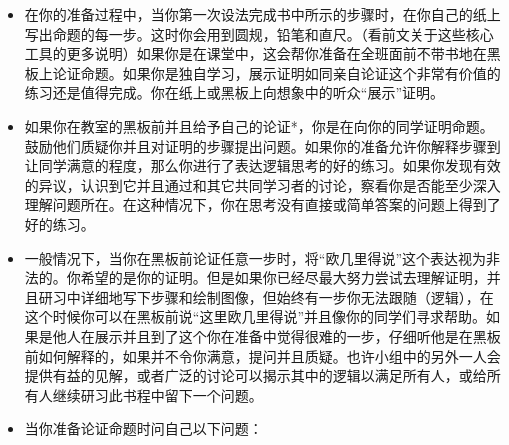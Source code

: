 \documentclass[
]{book}
\begin{document}
\begin{itemize}
\item
  在你的准备过程中，当你第一次设法完成书中所示的步骤时，在你自己的纸上写出命题的每一步。这时你会用到圆规，铅笔和直尺。（看前文关于这些核心工具的更多说明）如果你是在课堂中，这会帮你准备在全班面前不带书地在黑板上论证命题。如果你是独自学习，展示证明如同亲自论证这个非常有价值的练习还是值得完成。你在纸上或黑板上向想象中的听众``展示''证明。
\item
  如果你在教室的黑板前并且给予自己的论证*，你是在向你的同学证明命题。鼓励他们质疑你并且对证明的步骤提出问题。如果你的准备允许你解释步骤到让同学满意的程度，那么你进行了表达逻辑思考的好的练习。如果你发现有效的异议，认识到它并且通过和其它共同学习者的讨论，察看你是否能至少深入理解问题所在。在这种情况下，你在思考没有直接或简单答案的问题上得到了好的练习。
\item
  一般情况下，当你在黑板前论证任意一步时，将``欧几里得说''这个表达视为非法的。你希望的是你的证明。但是如果你已经尽最大努力尝试去理解证明，并且研习中详细地写下步骤和绘制图像，但始终有一步你无法跟随（逻辑），在这个时候你可以在黑板前说``这里欧几里得说''并且像你的同学们寻求帮助。如果是他人在展示并且到了这个你在准备中觉得很难的一步，仔细听他是在黑板前如何解释的，如果并不令你满意，提问并且质疑。也许小组中的另外一人会提供有益的见解，或者广泛的讨论可以揭示其中的逻辑以满足所有人，或给所有人继续研习此书程中留下一个问题。
\item
  当你准备论证命题时问自己以下问题：


\end{itemize}
\end{document}
